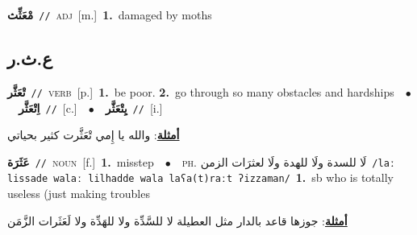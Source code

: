 \documentclass[10pt,a4paper,twoside]{article} %
\begin{document}
\begin{multicols}{2}
{\setlength\topsep{0pt}\textbf{\foreignlanguage{arabic}{مْعَثِّث}}\ {\color{gray}\texttt{//}\color{black}}\ \textsc{adj}\ [m.]\ \textbf{1.}~damaged by moths\ } \vspace{2mm}

\vspace{-3mm}
\subsection*{\color{blue}\foreignlanguage{arabic}{ع.ث.ر}\color{blue}{}} 

{\setlength\topsep{0pt}\textbf{\foreignlanguage{arabic}{تْعَثَّر}}\ {\color{gray}\texttt{//}\color{black}}\ \textsc{verb}\ [p.]\ \textbf{1.}~be poor.  \textbf{2.}~go through so many obstacles and hardships\ \ $\bullet$\ \ \setlength\topsep{0pt}\textbf{\foreignlanguage{arabic}{اِتْعَثَّر}}\ {\color{gray}\texttt{//}\color{black}}\ [c.]\ \ $\bullet$\ \ \setlength\topsep{0pt}\textbf{\foreignlanguage{arabic}{يِتْعَثَّر}}\ {\color{gray}\texttt{//}\color{black}}\ [i.]\  \begin{flushright}\color{gray}\foreignlanguage{arabic}{\textbf{\underline{\foreignlanguage{arabic}{أمثلة}}}: والله يا إِمي تْعَثَّرت كثير بحياتي}\end{flushright}\color{black}} \vspace{2mm}

{\setlength\topsep{0pt}\textbf{\foreignlanguage{arabic}{عَثَرَة}}\ {\color{gray}\texttt{//}\color{black}}\ \textsc{noun}\ [f.]\ \textbf{1.}~misstep\ \ $\bullet$\ \ \textsc{ph.} \color{gray} \foreignlanguage{arabic}{لَا للسدة ولَا للهدة ولَا لعثرَات الزمن}\color{black}\ {\color{gray}\texttt{/{\sffamily laː lissade walaː lilhadde wala laʕa(t)raːt ʔizzaman}/}\color{black}}\ \textbf{1.}~sb who is totally useless (just making troubles\  \begin{flushright}\color{gray}\foreignlanguage{arabic}{\textbf{\underline{\foreignlanguage{arabic}{أمثلة}}}: جوزها قاعد بالدار مثل العطيلة لا للسَّدِّة ولا للهَدِّة ولا لَعَثَرات الزَّمَن}\end{flushright}\color{black}} \vspace{2mm}


\end{multicols}
\end{document}
